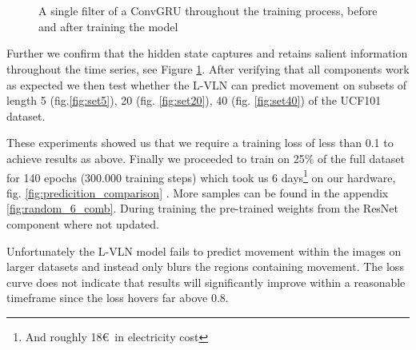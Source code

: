 \documentclass[runningheads,a4paper]{llncs}
\begin{document}
\begin{figure}[htb]
\captionsetup[subfigure]{width=0.2\textwidth}
 \advance\leftskip-4cm
  \ \subfloat[\label{label-1}]{} \\[\topskip]
  \ \subfloat[\label{label-2}]{}
  \caption{ A single filter of a ConvGRU throughout the training process, before and after training the model }
  \label{fig:gru_filter}
\end{figure}


 Further we confirm that the hidden state captures and retains salient information throughout the time series, see Figure \ref{fig:gru_filter}.
  After verifying that all components work as expected we then test whether the L-VLN can predict movement on subsets of length 5 (fig.\ref{fig:set5}), 20 (fig. \ref{fig:set20}), 40 (fig. \ref{fig:set40}) of the UCF101 dataset.

   These experiments showed us that we require a training loss of less than 0.1 to achieve results as above. Finally we proceeded to train on 25\% of the full dataset for 140 epochs (300.000 training steps) which took us 6 days\footnote{And roughly 18\euro \ in electricity cost}  on our hardware, fig. \ref{fig:predicition_comparison} . More samples can be found in the appendix \ref{fig:random_6_comb}. During training the pre-trained weights from the ResNet component where not updated.


Unfortunately the L-VLN model fails to predict movement within the images on larger datasets and instead only blurs the regions containing movement. The loss curve does not indicate that results will significantly improve within a reasonable timeframe since the loss hovers far above 0.8.
\end{document}
